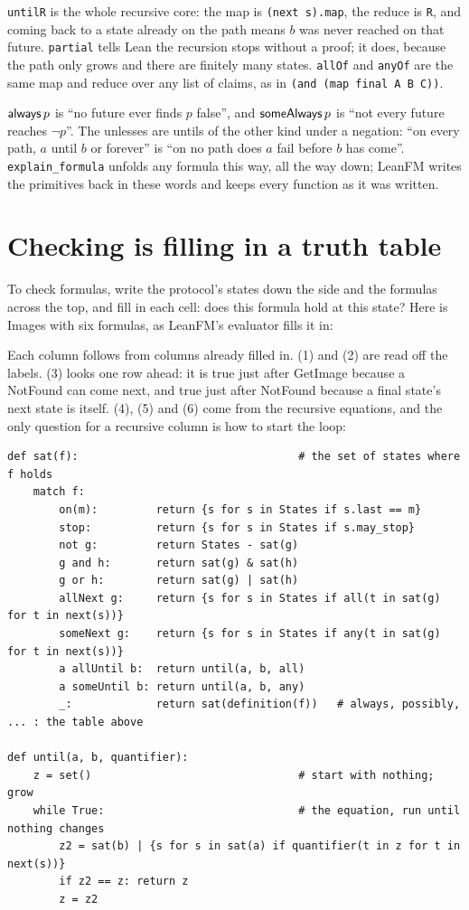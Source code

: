 

\texttt{untilR} is the whole recursive core: the map is \texttt{(next s).map}, the reduce is
\texttt{R}, and coming back to a state already on the path means $b$ was never reached on that
future. \texttt{partial} tells Lean the recursion stops without a proof; it does, because the
path only grows and there are finitely many states. \texttt{allOf} and \texttt{anyOf} are the
same map and reduce over any list of claims, as in \texttt{(and (map final A B C))}.

$\mathsf{always}\, p$ is ``no future ever finds $p$ false'', and $\mathsf{someAlways}\, p$ is ``not every future
reaches $\neg p$''. The unlesses are untils of the other kind under a negation: ``on every
path, $a$ until $b$ or forever'' is ``on no path does $a$ fail before $b$ has come''.
\texttt{explain\_formula} unfolds any formula this way, all the way down; LeanFM writes the
primitives back in these words and keeps every function as it was written.

\section{Checking is filling in a truth table}

To check formulas, write the protocol's states down the side and the formulas across the
top, and fill in each cell: does this formula hold at this state? Here is Images with six
formulas, as LeanFM's evaluator fills it in:


Each column follows from columns already filled in. (1) and (2) are read off the labels.
(3) looks one row ahead: it is true just after GetImage because a NotFound can come next,
and true just after NotFound because a final state's next state is itself. (4), (5) and (6)
come from the recursive equations, and the only question for a recursive column is how
to start the loop:

\begin{lstlisting}[language={},basicstyle=\ttfamily\footnotesize]
def sat(f):                                  # the set of states where f holds
    match f:
        on(m):         return {s for s in States if s.last == m}
        stop:          return {s for s in States if s.may_stop}
        not g:         return States - sat(g)
        g and h:       return sat(g) & sat(h)
        g or h:        return sat(g) | sat(h)
        allNext g:     return {s for s in States if all(t in sat(g) for t in next(s))}
        someNext g:    return {s for s in States if any(t in sat(g) for t in next(s))}
        a allUntil b:  return until(a, b, all)
        a someUntil b: return until(a, b, any)
        _:             return sat(definition(f))   # always, possibly, ... : the table above

def until(a, b, quantifier):
    z = set()                                # start with nothing; grow
    while True:                              # the equation, run until nothing changes
        z2 = sat(b) | {s for s in sat(a) if quantifier(t in z for t in next(s))}
        if z2 == z: return z
        z = z2
\end{lstlisting}

